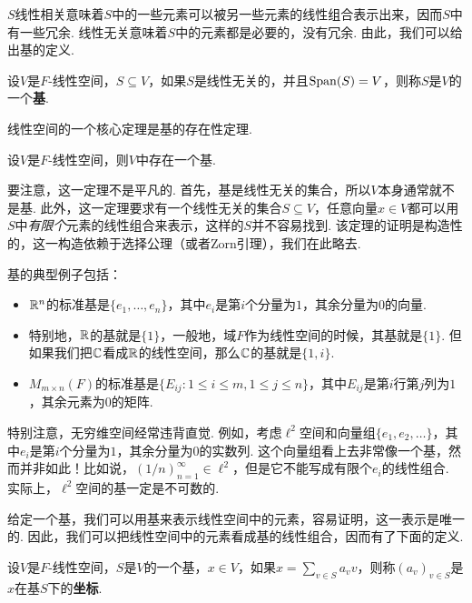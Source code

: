 $S$线性相关意味着$S$中的一些元素可以被另一些元素的线性组合表示出来，因而$S$中有一些冗余. 线性无关意味着$S$中的元素都是必要的，没有冗余. 由此，我们可以给出基的定义. 

\begin{definition}[基]
设$V$是$F$-线性空间，$S\subseteq V$，如果$S$是线性无关的，并且$\operatorname*{Span}(S)=V$，则称$S$是$V$的一个\textbf{基}. 
\end{definition}

线性空间的一个核心定理是基的存在性定理. 

\begin{theorem}[基的存在性定理]\label{thm:existence-of-basis}
设$V$是$F$-线性空间，则$V$中存在一个基. 
\end{theorem}

要注意，这一定理不是平凡的. 首先，基是线性无关的集合，所以$V$本身通常就不是基. 此外，这一定理要求有一个线性无关的集合$S\subseteq V$，任意向量$x\in V$都可以用$S$中\textit{有限个}元素的线性组合来表示，这样的$S$并不容易找到. 该定理的证明是构造性的，这一构造依赖于选择公理（或者Zorn引理），我们在此略去. 

基的典型例子包括：
\begin{itemize}
    \item $\mathbb{R}^n$的标准基是$\{e_1,\dots,e_n\}$，其中$e_i$是第$i$个分量为$1$，其余分量为$0$的向量. 
    \item 特别地，$\mathbb{R}$的基就是$\{1\}$，一般地，域$F$作为线性空间的时候，其基就是$\{1\}$. 但如果我们把$\mathbb{C}$看成$\mathbb{R}$的线性空间，那么$\mathbb{C}$的基就是$\{1,i\}$.
    \item $M_{m\times n}(F)$的标准基是$\{E_{ij}:1\leq i\leq m,1\leq j\leq n\}$，其中$E_{ij}$是第$i$行第$j$列为$1$，其余元素为$0$的矩阵. 
\end{itemize}

特别注意，无穷维空间经常违背直觉. 例如，考虑$\ell^2$空间和向量组$\{e_1,e_2,\dots\}$，其中$e_i$是第$i$个分量为$1$，其余分量为$0$的实数列. 这个向量组看上去非常像一个基，然而并非如此！比如说，$(1/n)_{n=1}^\infty\in\ell^2$，但是它不能写成有限个$e_i$的线性组合. 实际上，$\ell^2$空间的基一定是不可数的. 

给定一个基，我们可以用基来表示线性空间中的元素，容易证明，这一表示是唯一的. 因此，我们可以把线性空间中的元素看成基的线性组合，因而有了下面的定义. 

\begin{definition}[坐标]
设$V$是$F$-线性空间，$S$是$V$的一个基，$x\in V$，如果$x=\sum_{v\in S} a_v v$，则称$(a_v)_{v\in S}$是$x$在基$S$下的\textbf{坐标}. 
\end{definition}

